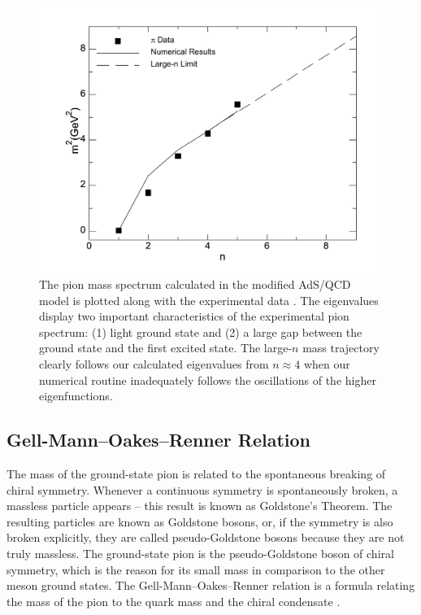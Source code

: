 \begin{figure}[htb]
\begin{center}
\includegraphics[scale=0.42]{linear.pdf}
\caption{The pion mass spectrum calculated in the modified AdS/QCD model is plotted along with the experimental data \cite{PDG}. 
The eigenvalues display two important characteristics of the experimental pion spectrum: (1) light ground state and (2) a large gap between the ground state and the first excited state. 
The large-$n$ mass trajectory clearly follows our calculated eigenvalues from $n\approx 4$ when our numerical routine inadequately follows the oscillations of the higher eigenfunctions.}
\label{fig:mass}
\end{center}
\end{figure}

\subsection{Gell-Mann--Oakes--Renner Relation}
\label{sub:GMOR}
The mass of the ground-state pion is related to the spontaneous breaking of chiral symmetry.
Whenever a continuous symmetry is spontaneously broken, a massless particle appears -- this result is known as Goldstone's Theorem.
The resulting particles are known as Goldstone bosons, or, if the symmetry is also broken explicitly, they are called pseudo-Goldstone bosons because they are not truly massless.
The ground-state pion is the pseudo-Goldstone boson of chiral symmetry, which is the reason for its small mass in comparison to the other meson ground states.
The Gell-Mann--Oakes--Renner relation is a formula relating the mass of the pion to the quark mass and the chiral condensate \cite{GMOR}.
 

